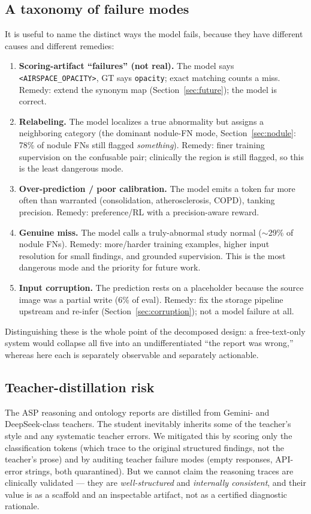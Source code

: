 \documentclass[11pt,a4paper]{article}
\begin{document}
\subsection{A taxonomy of failure modes}
It is useful to name the distinct ways the model fails, because they have different causes and different remedies:
\begin{enumerate}[leftmargin=1.6em]
  \item \textbf{Scoring-artifact ``failures'' (not real).} The model says \texttt{<AIRSPACE\_OPACITY>}, GT says \texttt{opacity}; exact matching counts a miss. Remedy: extend the synonym map (Section~\ref{sec:future}); the model is correct.
  \item \textbf{Relabeling.} The model localizes a true abnormality but assigns a neighboring category (the dominant nodule-FN mode, Section~\ref{sec:nodule}: 78\% of nodule FNs still flagged \emph{something}). Remedy: finer training supervision on the confusable pair; clinically the region is still flagged, so this is the least dangerous mode.
  \item \textbf{Over-prediction / poor calibration.} The model emits a token far more often than warranted (consolidation, atherosclerosis, COPD), tanking precision. Remedy: preference/RL with a precision-aware reward.
  \item \textbf{Genuine miss.} The model calls a truly-abnormal study normal ($\sim$29\% of nodule FNs). Remedy: more/harder training examples, higher input resolution for small findings, and grounded supervision. This is the most dangerous mode and the priority for future work.
  \item \textbf{Input corruption.} The prediction rests on a placeholder because the source image was a partial write (6\% of eval). Remedy: fix the storage pipeline upstream and re-infer (Section~\ref{sec:corruption}); not a model failure at all.
\end{enumerate}
Distinguishing these is the whole point of the decomposed design: a free-text-only system would collapse all five into an undifferentiated ``the report was wrong,'' whereas here each is separately observable and separately actionable.

\subsection{Teacher-distillation risk}
The ASP reasoning and ontology reports are distilled from Gemini- and DeepSeek-class teachers. The student inevitably inherits some of the teacher's style and any systematic teacher errors. We mitigated this by scoring only the classification tokens (which trace to the original structured findings, not the teacher's prose) and by auditing teacher failure modes (empty responses, API-error strings, both quarantined). But we cannot claim the reasoning traces are clinically validated --- they are \emph{well-structured} and \emph{internally consistent}, and their value is as a scaffold and an inspectable artifact, not as a certified diagnostic rationale.
\end{document}

